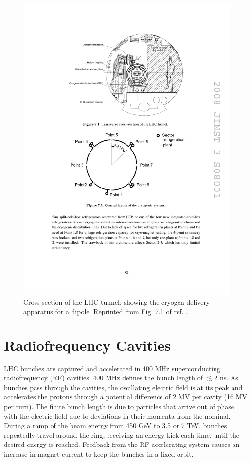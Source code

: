 \documentclass[dissertation.tex]{subfiles}
\begin{document}
\begin{figure}
	\centering
	\includegraphics[scale=1.0]{tunnel_cross_section}
	\caption{Cross section of the LHC tunnel, showing the cryogen delivery apparatus for a dipole.  Reprinted from Fig. 7.1 of ref. \cite{1748-0221-3-08-S08001}.}
	\label{fig:tunnel_cross_section}
\end{figure}

\section{Radiofrequency Cavities}
\label{sec:Radiofrequency Cavities}

LHC bunches are captured and accelerated in 400 MHz superconducting radiofrequency (RF) cavities.  400 MHz defines the bunch length of $\lesssim2$ ns.  As bunches pass through the cavities, the oscillating electric field is at its peak and accelerates the protons through a potential difference of 2 MV per cavity (16 MV per turn).  The finite bunch length is due to particles that arrive out of phase with the electric field due to deviations in their momenta from the nominal.  During a ramp of the beam energy from 450 GeV to 3.5 or 7 TeV, bunches repeatedly travel around the ring, receiving an energy kick each time, until the desired energy is reached.  Feedback from the RF accelerating system causes an increase in magnet current to keep the bunches in a fixed orbit.
\end{document}
